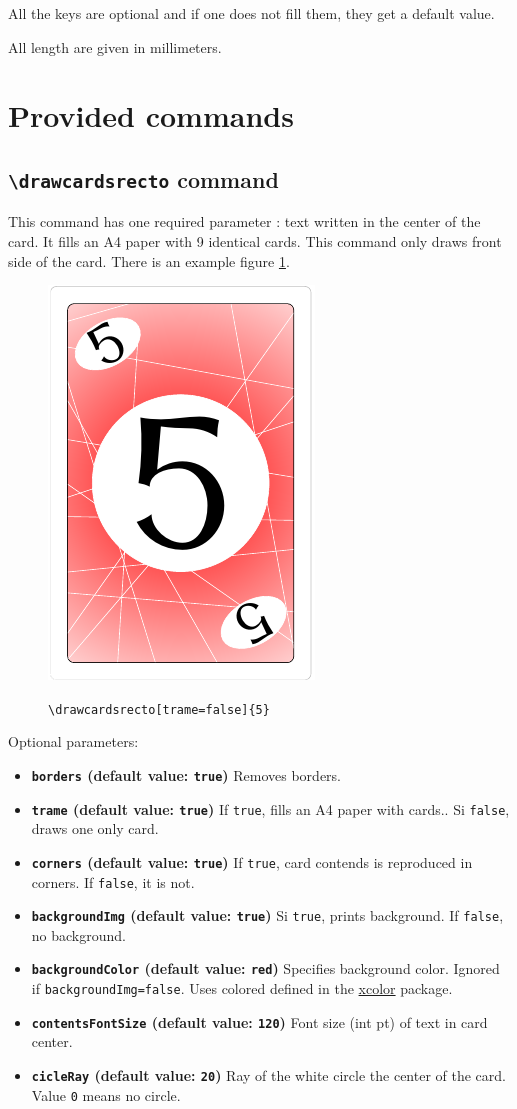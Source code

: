 \documentclass[a4paper, 12pt]{article}
\newcommand{\key}[3]{\textbf{\texttt{#1} (default value: \texttt{#2})} #3}
\newcommand{\commande}[1]{\texttt{\textbackslash#1}}
\begin{document}
All the keys are optional and if one does not fill them, they get a default value.

All length are given in millimeters.

\section{Provided commands}
	\subsection{\commande{drawcardsrecto} command}
This command has one required parameter : text written in the center of the card. It fills an A4 paper with 9 identical cards. This command only draws front side of the card. There is an example figure \ref{fig:recto}.
\begin{figure}[h]\begin{center}
	\caption{\commande{drawcardsrecto[trame=false]\{5\}}}
	\includegraphics{screen01.png}\label{fig:recto}
\end{center}\end{figure}

Optional parameters:
\begin{itemize}
	\item \key{borders}{true}{Removes borders.}
	\item \key{trame}{true}{If \texttt{true}, fills an A4 paper with cards.. Si \texttt{false}, draws one only card.}
	\item \key{corners}{true}{If \texttt{true}, card contends is reproduced in corners. If \texttt{false}, it is not.}
	\item \key{backgroundImg}{true}{Si \texttt{true}, prints background. If \texttt{false}, no background.}
	\item \key{backgroundColor}{red}{Specifies background color. Ignored if \texttt{backgroundImg=false}. Uses colored defined in the \href{https://www.ctan.org/pkg/xcolor}{xcolor} package.}
	\item \key{contentsFontSize}{120}{Font size (int pt) of text in card center.}
	\item \key{cicleRay}{20}{Ray of the white circle the center of the card. Value \texttt 0 means no circle.}
\end{itemize}
\end{document}
